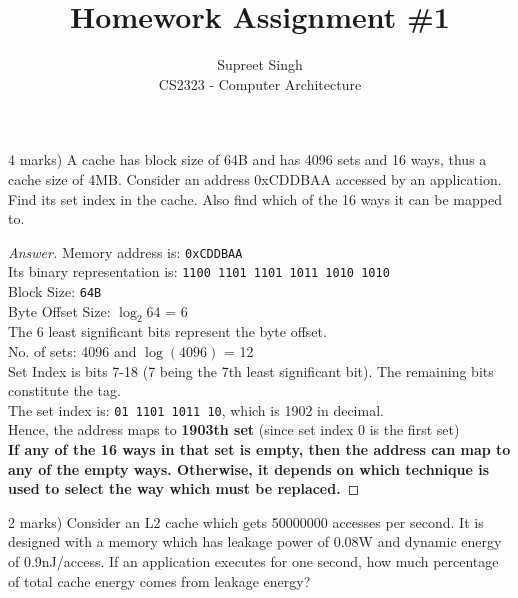\documentclass[12pt]{article}
\newenvironment{exercise}[2][Exercise]{\begin{trivlist}
\item[\hskip \labelsep {\bfseries #1}\hskip \labelsep {\bfseries #2.}]}{\end{trivlist}}
\begin{document}
 

\renewcommand{\qedsymbol}{} %
 
\title{Homework Assignment \#1}
\author{Supreet Singh\\ 
CS2323 - Computer Architecture} 
 
\maketitle
{} 
\begin{exercise}[Question]{1} 
(4 marks) A cache has block size of 64B and has 4096 sets and 16 ways, thus
a cache size of 4MB. Consider an address 0xCDDBAA accessed by an
application. Find its set index in the cache. Also find which of the 16 ways it can
be mapped to.
\end{exercise}
 
\begin{proof}[Answer]
Memory address is: \texttt{0xCDDBAA} \\
Its binary representation is: \verb|1100 1101 1101 1011 1010 1010| \\
Block Size: \verb|64B| \\
Byte Offset Size: $\log_2 64$ = 6 \\
The 6 least significant bits represent the byte offset. \\
No. of sets: 4096 and $\log(4096)$ = 12 \\
Set Index is bits 7-18 (7 being the 7th least significant bit). The remaining bits constitute the tag. \\
The set index is: \verb|01 1101 1011 10|, which is 1902 in decimal. \\
Hence, the address maps to \textbf{1903th set} (since set index 0 is the first set) \\
\textbf{If any of the 16 ways in that set is empty, then the address can map to any of the empty ways. Otherwise, it depends on which technique is used to select the way which must be replaced.}

\end{proof} 
\begin{exercise}[Question]{2}
(2 marks) Consider an L2 cache which gets 50000000 accesses per second. It is
designed with a memory which has leakage power of 0.08W and dynamic energy of
0.9nJ/access. If an application executes for one second, how much percentage of
total cache energy comes from leakage energy? 
\end{exercise}
 
\end{document}
